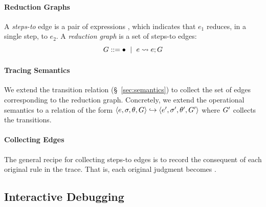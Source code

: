 \paragraph{Reduction Graphs}
%
A \emph{steps-to} edge is a pair of expressions , which
indicates that $e_1$ reduces, in a single step, to $e_2$.
%
%
A \emph{reduction graph} is a set of steps-to edges:
$$G ::= \bullet \ \mid\  e \rightsquigarrow e; G$$  %

\paragraph{Tracing Semantics}
%
We extend the transition relation (\S~\ref{sec:semantics}) to
collect the set of edges corresponding to the reduction graph.
%
Concretely, we extend the operational semantics to
a relation of the form $\langle e, \sigma, \theta, G \rangle \hookrightarrow \langle e', \sigma', \theta', G' \rangle$
where $G'$ collects the transitions.

\paragraph{Collecting Edges}
%
%
The general recipe for collecting steps-to edges is
to record the consequent of each original rule in the
trace. That is, each original judgment 
becomes .
%



\subsection{Interactive Debugging}
\label{sec:traversing-graph}

